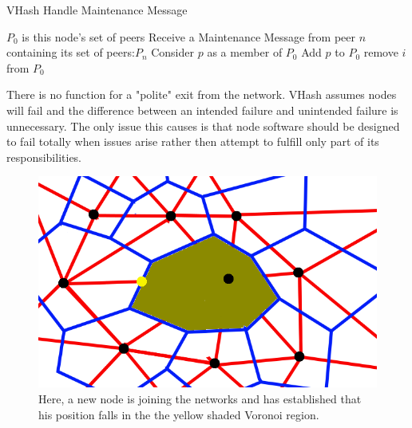 \documentclass[11pt]{IEEEtran} %
\begin{document}
\begin{algorithm}
\caption{VHash Handle Maintenance Message}
\label{handlemaint}
\begin{algorithmic}[1]  %
	\STATE $P_0$ is this node's set of peers
	\STATE Receive a Maintenance Message from peer $n$ containing its set of peers:$P_n$
    	\STATE Consider $p$ as a member of $P_0$
        	\STATE Add $p$ to $P_0$
                	\STATE remove $i$ from $P_0$
                \ENDIF
            \ENDFOR
        \ENDIF
    \ENDFOR
\end{algorithmic}
\end{algorithm}




There is no function for a "polite" exit from the network. VHash  assumes nodes will fail and the difference between an intended failure and unintended failure is unnecessary. The only issue this causes is that node software should be designed to fail totally when issues arise rather then attempt to fulfill only part of its responsibilities.  





\begin{figure}
    \includegraphics[width=\linewidth]{voronoi-churn4}
    \caption{Here, a new node is joining the networks and has established that his position falls in the the yellow shaded Voronoi region.}
    \label{churnjoin}
\end{figure}
\end{document}
